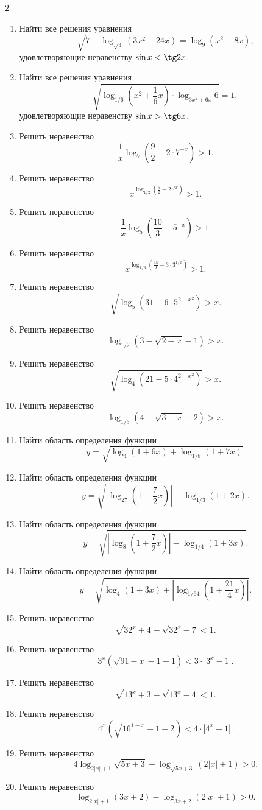 \documentclass[14pt,a4paper,landscape]{article}
\begin{document}
\begin{multicols}{2}
\begin{enumerate}[label=3.\arabic*, leftmargin=1.5em]
    \item Найти все решения уравнения $$\sqrt{7 - \log_{\sqrt{3}}(3x^2-24x)} = \log_9(x^2-8x),$$ удовлетворяющие неравенству $\sin x < \tg 2x$.
    \item Найти все решения уравнения $$\sqrt{\log_{1/6}\left(x^2+\frac{1}{6}x\right) \cdot \log_{3x^2+6x} 6} = 1,$$ удовлетворяющие неравенству $\sin x > \tg 6x$.
    \item Решить неравенство $$\frac{1}{x}\log_7\left(\frac{9}{2} - 2 \cdot 7^{-x}\right) > 1.$$
    \item Решить неравенство $$x^{\log_{1/2}\left(\frac{5}{2} - 2^{1/x}\right)} > 1.$$
    \item Решить неравенство $$\frac{1}{x}\log_5\left(\frac{10}{3} - 5^{-x}\right) > 1.$$
    \item Решить неравенство $$x^{\log_{1/3}\left(\frac{28}{3} - 3 \cdot 3^{1/x}\right)} > 1.$$
    \item Решить неравенство $$\sqrt{\log_5(31 - 6 \cdot 5^{2-x^2})} > x.$$
    \item Решить неравенство $$\log_{1/2}(3 - \sqrt{2-x} - 1) > x.$$
    \item Решить неравенство $$\sqrt{\log_4(21 - 5 \cdot 4^{2-x^2})} > x.$$
    \item Решить неравенство $$\log_{1/3}(4 - \sqrt{3-x} - 2) > x.$$
    \item Найти область определения функции $$y = \sqrt{\log_4(1+6x) + \log_{1/8}(1+7x)}.$$
    \item Найти область определения функции $$y = \sqrt{\left|\log_{27}\left(1+\frac{7}{2}x\right)\right| - \log_{1/3}(1+2x)}.$$
    \item Найти область определения функции $$y = \sqrt{\left|\log_8\left(1+\frac{7}{2}x\right)\right| - \log_{1/4}(1+3x)}.$$
    \item Найти область определения функции $$y = \sqrt{\log_4(1+3x) + \left|\log_{1/64}\left(1+\frac{21}{4}x\right)\right|}.$$
    \item Решить неравенство $$\sqrt{32^x+4} - \sqrt{32^x-7} < 1.$$
    \item Решить неравенство $$3^x(\sqrt{91-x}-1+1) < 3 \cdot |3^x-1|.$$
    \item Решить неравенство $$\sqrt{13^x+3} - \sqrt{13^x-4} < 1.$$
    \item Решить неравенство $$4^x(\sqrt{16^{1-x}-1+2}) < 4 \cdot |4^x-1|.$$
    \item Решить неравенство $$4\log_{2|x|+1}\sqrt{5x+3} - \log_{\sqrt{5x+3}}(2|x|+1) > 0.$$
    \item Решить неравенство $$\log_{2|x|+1}(3x+2) - \log_{3x+2}(2|x|+1) > 0.$$

\end{enumerate}
\end{multicols}
\end{document}
